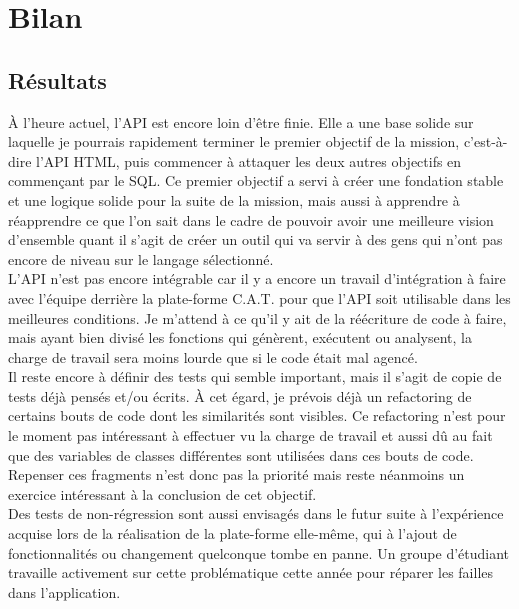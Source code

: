 \titleformat{\chapter}[display]
  {\normalfont\bfseries}{}{0pt}{\Large}

\chapter{Bilan}

\section{Résultats}

À l'heure actuel, l'API est encore loin d'être finie. Elle a une base solide sur laquelle je pourrais rapidement terminer le premier objectif de la mission, c'est-à-dire l'API HTML, puis commencer à attaquer les deux autres objectifs en commençant par le SQL. Ce premier objectif a servi à créer une fondation stable et une logique solide pour la suite de la mission, mais aussi à apprendre à réapprendre ce que l'on sait dans le cadre de pouvoir avoir une meilleure vision d'ensemble quant il s'agit de créer un outil qui va servir à des gens qui n'ont pas encore de niveau sur le langage sélectionné.\\

L'API n'est pas encore intégrable car il y a encore un travail d'intégration à faire avec l’équipe derrière la plate-forme C.A.T. pour que l'API soit utilisable dans les meilleures conditions. Je m'attend à ce qu'il y ait de la réécriture de code à faire, mais ayant bien divisé les fonctions qui génèrent, exécutent ou analysent, la charge de travail sera moins lourde que si le code était mal agencé.\\

Il reste encore à définir des tests qui semble important, mais il s'agit de copie de tests déjà pensés et/ou écrits. À cet égard, je prévois déjà un refactoring de certains bouts de code dont les similarités sont visibles. Ce refactoring n'est pour le moment pas intéressant à effectuer vu la charge de travail et aussi dû au fait que des variables de classes différentes sont utilisées dans ces bouts de code. Repenser ces fragments n'est donc pas la priorité mais reste néanmoins un exercice intéressant à la conclusion de cet objectif.\\

Des tests de non-régression sont aussi envisagés dans le futur suite à l’expérience acquise lors de la réalisation de la plate-forme elle-même, qui à l'ajout de fonctionnalités ou changement quelconque tombe en panne. Un groupe d’étudiant travaille activement sur cette problématique cette année pour réparer les failles dans l'application.\\

